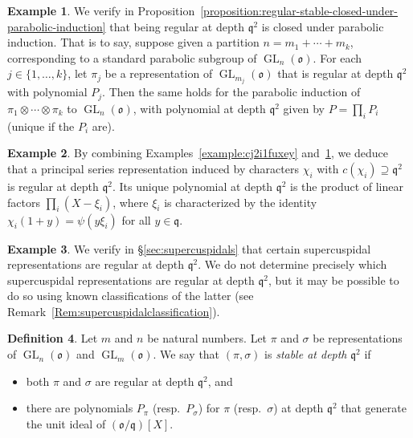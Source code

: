 \documentclass[reqno]{amsart}
\DeclareMathOperator{\GL}{GL}
\theoremstyle{plain} \newtheorem{theorem} {Theorem} \newtheorem{conjecture} {Conjecture} \newtheorem{corollary} [theorem] {Corollary} \newtheorem{proposition} [theorem] {Proposition} \newtheorem{fact} [theorem] {Fact}
\theoremstyle{definition} \newtheorem{definition} [theorem] {Definition}
\newtheorem{example} [theorem] {Example} \newtheorem{assertion}
\theoremstyle{itplain} %
\newcommand{\mfq}{\mathfrak{q}}
\begin{document}
\begin{example}\label{example:cj2i1fu0az}
  We verify in Proposition~\ref{proposition:regular-stable-closed-under-parabolic-induction} that being regular at depth $\mfq^2$ is closed under parabolic induction.  That is to say, suppose given a partition $n = m_1 + \dotsb + m_k$, corresponding to a standard parabolic subgroup of $\GL_n(\mathfrak{o})$.  For each $j \in \{1, \dotsc, k\}$, let $\pi_j$ be a representation of $\GL_{m_j}(\mathfrak{o})$ that is regular at depth $\mfq^2$ with polynomial $P_j$.  Then the same holds for the parabolic induction of $\pi_1 \otimes \dotsb \otimes \pi_k$ to $\GL_n(\mathfrak{o})$, with polynomial at depth $\mfq^2$ given by $P=\prod\limits_{i} P_i$ (unique if the $P_i$ are).
\end{example}
\begin{example}\label{Example:principalregular}
  By combining Examples~\ref{example:cj2i1fuxey} and~\ref{example:cj2i1fu0az}, we deduce that a principal series representation induced by characters $\chi_i$ with $c(\chi_i) \supseteq \mfq^2$ is regular at depth $\mfq^2$.  Its unique polynomial at depth $\mfq^2$ is the product of linear factors $\prod_{i} (X - \xi_i)$, where $\xi_i$ is characterized by the identity $\chi_i(1+y) = \psi(y \xi_i)$ for all $y \in \mfq$.
\end{example}
\begin{example}\label{Example:supercuspidaloverview}
  We verify in \S\ref{sec:supercuspidals} that certain supercuspidal representations are regular at depth $\mfq^2$.  We do not determine precisely which supercuspidal representations are regular at depth $\mfq^2$, but it may be possible to do so using known classifications of the latter (see Remark~\ref{Rem:supercuspidalclassification}).
\end{example}

\begin{definition}\label{definition:let-pi-sigma-be-repr-pair-gener-line-groups-over-f}
  Let $m$ and $n$ be natural numbers.  Let $\pi$ and $\sigma$ be representations of $\GL_{n}(\mathfrak{o})$ and $\GL_m(\mathfrak{o})$.  We say that $(\pi,\sigma)$ is \emph{stable at depth} $\mfq^2$ if
  \begin{itemize}
  \item both $\pi$ and $\sigma$ are regular at depth $\mfq^2$, and
  \item there are polynomials $P_\pi$ (resp.\ $P_\sigma$) for $\pi$ (resp.\ $\sigma$) at depth $\mfq^2$ that generate the unit ideal of $(\mathfrak{o}/\mfq)[X]$.
  \end{itemize}
\end{definition}
\end{document}
